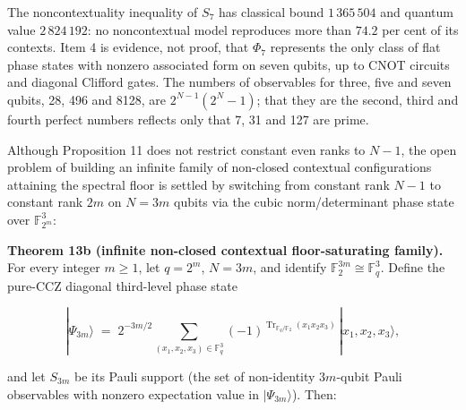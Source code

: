 \documentclass[11pt,a4paper]{article}
\begin{document}
The noncontextuality inequality of \(S_7\) has classical bound \(1\,365\,504\) and quantum value \(2\,824\,192\):
no noncontextual model reproduces more than \(74.2\) per cent of its contexts. Item 4 is evidence, not
proof, that \(\Phi_7\) represents the only class of flat phase states with nonzero associated form on
seven qubits, up to CNOT circuits and diagonal Clifford gates. The numbers of
observables for three, five and seven qubits, 28, 496 and 8128, are \(2^{N-1}(2^N-1)\); that they are the
second, third and fourth perfect numbers reflects only that 7, 31 and 127 are prime.

Although Proposition 11 does not restrict constant even ranks to \(N-1\), the open problem of building an
infinite family of non-closed contextual configurations attaining the spectral floor is settled by
switching from constant rank \(N-1\) to constant rank \(2m\) on \(N=3m\) qubits via the cubic norm/determinant
phase state over \(\mathbb{F}_{2^m}^3\):

\textbf{Theorem 13b (infinite non-closed contextual floor-saturating family).} For every integer \(m \ge 1\), let
\(q = 2^m\), \(N = 3m\), and identify \(\mathbb{F}_2^{3m} \cong \mathbb{F}_q^3\). Define the pure-CCZ diagonal
third-level phase state

\[|\Psi_{3m}\rangle \;=\; 2^{-3m/2} \sum_{(x_1, x_2, x_3) \in \mathbb{F}_q^3}
  (-1)^{\operatorname{Tr}_{\mathbb{F}_q/\mathbb{F}_2}(x_1 x_2 x_3)}\, |x_1, x_2, x_3\rangle ,\]

and let \(S_{3m}\) be its Pauli support (the set of non-identity \(3m\)-qubit Pauli observables with nonzero
expectation value in \(|\Psi_{3m}\rangle\)). Then:
\end{document}

